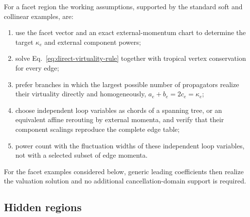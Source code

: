 \documentclass[a4paper,11pt]{article}
\begin{document}
For a facet region the working assumptions, supported by the standard soft
and collinear examples, are:
\begin{enumerate}[label=(\roman*)]
 \item use the facet vector and an exact external-momentum chart to determine
 the target \(\kappa_e\) and external component powers;
 \item solve Eq.~\eqref{eq:direct-virtuality-rule} together with tropical
 vertex conservation for every edge;
 \item prefer branches in which the largest possible number of propagators
 realize their virtuality directly and homogeneously,
 \(a_e+b_e=2c_e=\kappa_e\);
 \item choose independent loop variables as chords of a spanning tree, or an
 equivalent affine rerouting by external momenta, and verify that their
 component scalings reproduce the complete edge table;
 \item power count with the fluctuation widths of these independent loop
 variables, not with a selected subset of edge momenta.
\end{enumerate}
For the facet examples considered below, generic leading coefficients then
realize the valuation solution and no additional cancellation-domain support
is required.

\subsection{Hidden regions}
\end{document}
